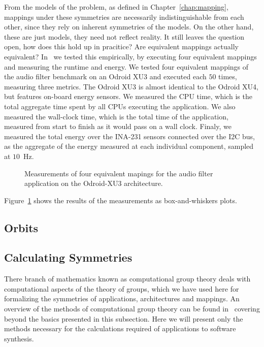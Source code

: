 From the models of the problem, as defined in Chapter~\ref{chap:mapping}, mappings under these symmetries are necessarily indistinguishable from each other, since they rely on inherent symmetries of the models.
On the other hand, these are just models, they need not reflect reality.
It still leaves the question open, how does this hold up in pracitice?
Are equivalent mappings actually equivalent?
In~\cite{goens_scopes17} we tested this empirically, by executing four equivalent mappings and measuring the runtime and energy.
We tested four equivalent mappings of the audio filter benchmark on an Odroid XU3 and executed each $50$ times, measuring three metrics.
The Odroid XU3 is almost identical to the Odroid XU4, but features on-board energy sensors.
We measured the \acs{CPU} time, which is the total aggregate time spent by all \acsp{CPU} executing the application.
We also measured the wall-clock time, which is the total time of the application, measured from start to finish as it would pass on a wall clock.
Finaly, we measured the total energy over the INA-231 sensors connected over the I2C bus, as the aggregate of the energy measured at each individual component, sampled at $10$~Hz.

\begin{figure}[h]
	\centering
\resizebox{0.95\textwidth}{!}{
     
 }
   \caption{Measurements of four equivalent mapings for the audio filter application on the Odroid-XU3 architecture.}
   \label{fig:symmetry_measurements}
\end{figure}

Figure~\ref{fig:symmetry_measurements} shows the results of the measurements as box-and-whiskers plots. 
\subsection{Orbits} 

\subsection{Calculating Symmetries}
There branch of mathematics known as computational group theory deals with computational aspects of the theory of groups, which we have used here for formalizing the symmetries of applications, architectures and mappings. 
An overview of the methods of computational group theory can be found in~\cite{seress2003permutation} covering beyond the basics presented in this subsection.
Here we will present only the methods necessary for the calculations required of applications to software synthesis.

